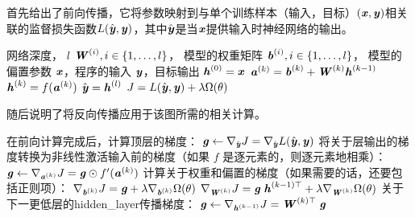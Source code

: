 首先给出了前向传播，它将参数映射到与单个训练样本（输入，目标）$(\boldsymbol{\mathit{x}},\boldsymbol{\mathit{y}})$相关联的监督损失函数$L(\hat{\Vy}, \Vy)$，其中$\hat{\Vy}$是当$\Vx$提供输入时神经网络的输出。
\begin{algorithm}[ht]
\caption{典型深度神经网络中的\gls{forward_propagation}和代价函数的计算。
损失函数$L(\hat{\Vy}, \Vy)$取决于输出$\hat{\Vy}$和目标$\Vy$（参考中损失函数的示例）。
为了获得总代价$J$，损失函数可以加上正则项$\Omega(\theta)$，其中$\theta$包含所有参数（权重和偏置）。
说明了如何计算$J$关于参数$\MW$和$\Vb$的梯度。 为简单起见，该演示仅使用单个输入样本$\Vx$。
实际应用应该使用\gls{minibatch}。
请参考以获得更加真实的演示。}
\label{alg:mlp-fprop}
\begin{algorithmic}
\REQUIRE 网络深度， $l$
\REQUIRE $\boldsymbol{\mathit{W}}^{(i)}, i \in \{ 1, \dots, l\}$， 模型的权重矩阵
\REQUIRE $\boldsymbol{\mathit{b}}^{(i)}, i \in \{ 1, \dots, l\}$， 模型的偏置参数
\REQUIRE $\Vx$，程序的输入
\REQUIRE $\Vy$，目标输出
\STATE $\boldsymbol{\mathit{h}}^{(0)}=\boldsymbol{\mathit{x}}$
 \STATE $\boldsymbol{\mathit{a}}^{(k)} = \boldsymbol{\mathit{b}}^{(k)} + \boldsymbol{\mathit{W}}^{(k)} \boldsymbol{\mathit{h}}^{(k-1)}$
 \STATE $\boldsymbol{\mathit{h}}^{(k)} = f(\boldsymbol{\mathit{a}}^{(k)})$
\ENDFOR
\STATE $\hat{\boldsymbol{\mathit{y}}} = \boldsymbol{\mathit{h}}^{(l)}$
\STATE $J = L(\hat{\boldsymbol{\mathit{y}}},\boldsymbol{\mathit{y}}) + \lambda \Omega(\theta)$
\end{algorithmic}
\end{algorithm}

随后说明了将反向传播应用于该图所需的相关计算。
\begin{algorithm}[htbp]
\caption{深度神经网络中的反向计算，它不止使用了输入$\Vx $和目标$\Vy$。
该计算对于每一层$k$都产生了对激活$\Va^{(k)}$的梯度，从输出层开始向后计算一直到第一个\gls{hidden_layer}。
这些梯度可以看作是对每层的输出应如何调整以减小误差的指导，根据这些梯度可以获得对每层参数的梯度。
权重和偏置上的梯度可以立即用作随机梯度更新的一部分（梯度算出后即可执行更新），或者与其他基于梯度的优化方法一起使用。
}
\label{alg:mlp-bprop}
\begin{algorithmic}
\STATE 在前向计算完成后，计算顶层的梯度：
\STATE $\boldsymbol{\mathit{g}} \leftarrow \nabla_{\hat{\boldsymbol{\mathit{y}}}} J = \nabla_{\hat{\boldsymbol{\mathit{y}}}} L(\hat{\boldsymbol{\mathit{y}}},\boldsymbol{\mathit{y}})$
\STATE 将关于层输出的梯度转换为非线性激活输入前的梯度（如果 $f$ 是逐元素的，则逐元素地相乘）：
  \STATE $\boldsymbol{\mathit{g}} \leftarrow \nabla_{\boldsymbol{\mathit{a}}^{(k)}} J = \boldsymbol{\mathit{g}} \odot f'(\boldsymbol{\mathit{a}}^{(k)})$
  \STATE 计算关于权重和偏置的梯度（如果需要的话，还要包括正则项）：
  \STATE $\nabla_{\boldsymbol{\mathit{b}}^{(k)}} J = \boldsymbol{\mathit{g}} + \lambda \nabla_{\boldsymbol{\mathit{b}}^{(k)}} \Omega(\theta)$
  \STATE $\nabla_{\boldsymbol{\mathit{W}}^{(k)}} J = \boldsymbol{\mathit{g}} \; \boldsymbol{\mathit{h}}^{(k-1)\top} + \lambda \nabla_{\boldsymbol{\mathit{W}}^{(k)}} \Omega(\theta)$
  \STATE 关于下一更低层的\gls{hidden_layer}传播梯度：
  \STATE $\boldsymbol{\mathit{g}} \leftarrow \nabla_{\boldsymbol{\mathit{h}}^{(k-1)}} J = \boldsymbol{\mathit{W}}^{(k)\top} \; \boldsymbol{\mathit{g}}$
\ENDFOR
\end{algorithmic}
\end{algorithm}

